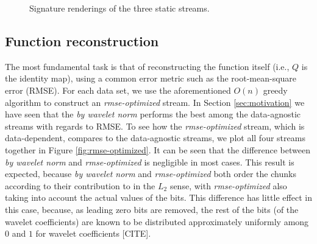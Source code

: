 \begin{figure}[h]
  \centering
 	\caption{Signature renderings of the three static streams.}
 	\label{fig:signature-static}
\end{figure}

\subsection{Function reconstruction}
\label{sec:rmse-optimized}

The most fundamental task is that of reconstructing the function itself (i.e., $Q$ is the identity
map), using a common error metric such as the root-mean-square error (RMSE). For each data set, we
use the aforementioned $O(n)$ greedy algorithm to construct an \emph{rmse-optimized} stream. In
Section \ref{sec:motivation} we have seen that the \emph{by wavelet norm} performs the best among
the data-agnostic streams with regards to RMSE. To see how the \emph{rmse-optimized} stream, which
is data-dependent, compares to the data-agnostic streams, we plot all four streams together in
Figure \ref{fig:rmse-optimized}. It can be seen that the difference between \emph{by wavelet norm}
and \emph{rmse-optimized} is negligible in most cases. This result is expected, because \emph{by
wavelet norm} and \emph{rmse-optimized} both order the chunks according to their contribution to in
the $L_2$ sense, with \emph{rmse-optimized} also taking into account the actual values of the bits.
This difference has little effect in this case, because, as leading zero bits are removed, the rest
of the bits (of the wavelet coefficients) are known to be distributed approximately uniformly among
$0$ and $1$ for wavelet coefficients [CITE]. 

